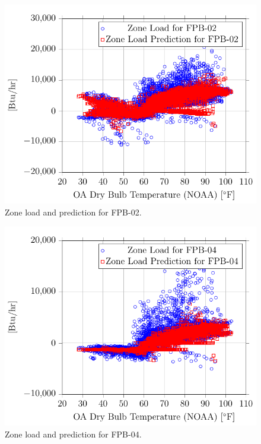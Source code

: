 \newcommand{\prestonRoyalZoneLoadCaption}[1]{Zone load and prediction for #1.}
\begin{figure}
\centering
\includegraphics{Plots/37-PrestonRoyalFPB-02-ZoneLoad/2017-08-07-0816-BtuhrvsOADryBulbTemperatureNOAAF.pdf}
\caption{\prestonRoyalZoneLoadCaption{FPB-02}}
\label{fig:2017-08-07-0816-BtuhrvsOADryBulbTemperatureNOAAF}
\end{figure}

\begin{figure}
\centering
\includegraphics{Plots/38-PrestonRoyalFPB-04-ZoneLoad/2017-08-07-0917-BtuhrvsOADryBulbTemperatureNOAAF.pdf}
\caption{\prestonRoyalZoneLoadCaption{FPB-04}}
\label{fig:2017-08-07-0917-BtuhrvsOADryBulbTemperatureNOAAF}
\end{figure}


